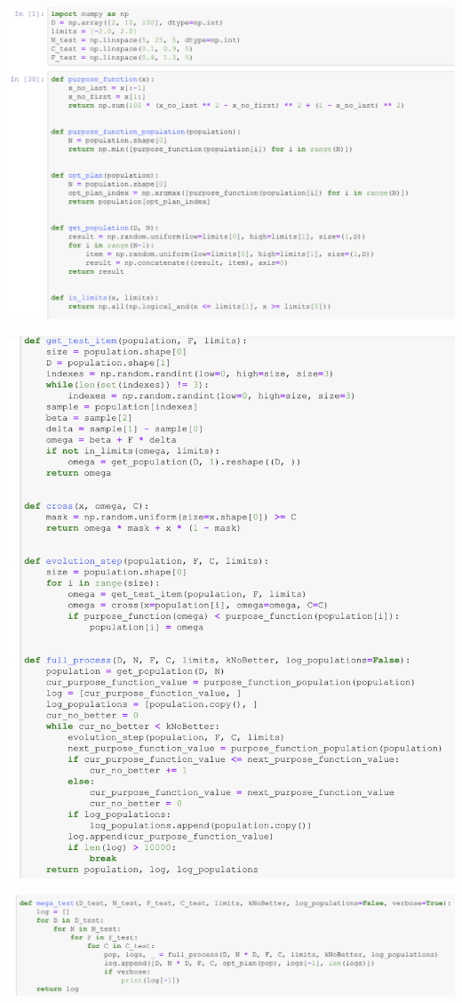 \documentclass[10pt,a4paper]{article}
\begin{document}
	\includegraphics[width=  \textwidth, keepaspectratio]{img/4}
	
	\includegraphics[width= \textwidth, keepaspectratio]{img/5}
	
	\includegraphics[width= \textwidth, keepaspectratio]{img/6}
	
\end{document}
